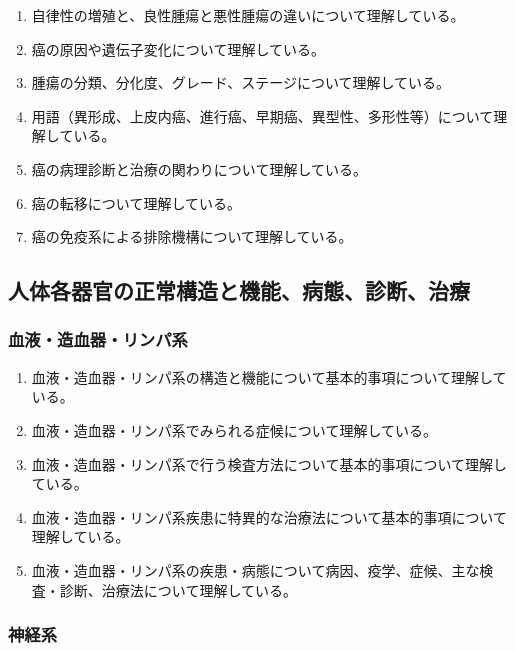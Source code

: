\begin{enumerate}
\item
  自律性の増殖と、良性腫瘍と悪性腫瘍の違いについて理解している。
\item
  癌の原因や遺伝子変化について理解している。
\item
  腫瘍の分類、分化度、グレード、ステージについて理解している。
\item
  用語（異形成、上皮内癌、進行癌、早期癌、異型性、多形性等）について理解している。
\item
  癌の病理診断と治療の関わりについて理解している。
\item
  癌の転移について理解している。
\item
  癌の免疫系による排除機構について理解している。
\end{enumerate}

\hypertarget{ux4ebaux4f53ux5404ux5668ux5b98ux306eux6b63ux5e38ux69cbux9020ux3068ux6a5fux80fdux75c5ux614bux8a3aux65adux6cbbux7642}{%
\subsection{人体各器官の正常構造と機能、病態、診断、治療}\label{ux4ebaux4f53ux5404ux5668ux5b98ux306eux6b63ux5e38ux69cbux9020ux3068ux6a5fux80fdux75c5ux614bux8a3aux65adux6cbbux7642}}

\hypertarget{ux8840ux6db2ux9020ux8840ux5668ux30eaux30f3ux30d1ux7cfb}{%
\subsubsection{血液・造血器・リンパ系}\label{ux8840ux6db2ux9020ux8840ux5668ux30eaux30f3ux30d1ux7cfb}}

\begin{enumerate}
\def\labelenumi{\arabic{enumi}.}
\tightlist
\item
  血液・造血器・リンパ系の構造と機能について基本的事項について理解している。
\item
  血液・造血器・リンパ系でみられる症候について理解している。
\item
  血液・造血器・リンパ系で行う検査方法について基本的事項について理解している。
\item
  血液・造血器・リンパ系疾患に特異的な治療法について基本的事項について理解している。
\item
  血液・造血器・リンパ系の疾患・病態について病因、疫学、症候、主な検査・診断、治療法について理解している。
\end{enumerate}

\hypertarget{ux795eux7d4cux7cfb}{%
\subsubsection{神経系}\label{ux795eux7d4cux7cfb}}

